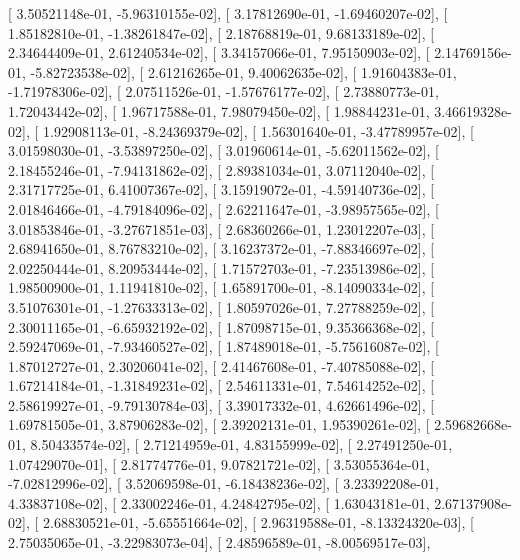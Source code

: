 \documentclass{article}
\begin{document}
       [  3.50521148e-01,  -5.96310155e-02],
       [  3.17812690e-01,  -1.69460207e-02],
       [  1.85182810e-01,  -1.38261847e-02],
       [  2.18768819e-01,   9.68133189e-02],
       [  2.34644409e-01,   2.61240534e-02],
       [  3.34157066e-01,   7.95150903e-02],
       [  2.14769156e-01,  -5.82723538e-02],
       [  2.61216265e-01,   9.40062635e-02],
       [  1.91604383e-01,  -1.71978306e-02],
       [  2.07511526e-01,  -1.57676177e-02],
       [  2.73880773e-01,   1.72043442e-02],
       [  1.96717588e-01,   7.98079450e-02],
       [  1.98844231e-01,   3.46619328e-02],
       [  1.92908113e-01,  -8.24369379e-02],
       [  1.56301640e-01,  -3.47789957e-02],
       [  3.01598030e-01,  -3.53897250e-02],
       [  3.01960614e-01,  -5.62011562e-02],
       [  2.18455246e-01,  -7.94131862e-02],
       [  2.89381034e-01,   3.07112040e-02],
       [  2.31717725e-01,   6.41007367e-02],
       [  3.15919072e-01,  -4.59140736e-02],
       [  2.01846466e-01,  -4.79184096e-02],
       [  2.62211647e-01,  -3.98957565e-02],
       [  3.01853846e-01,  -3.27671851e-03],
       [  2.68360266e-01,   1.23012207e-03],
       [  2.68941650e-01,   8.76783210e-02],
       [  3.16237372e-01,  -7.88346697e-02],
       [  2.02250444e-01,   8.20953444e-02],
       [  1.71572703e-01,  -7.23513986e-02],
       [  1.98500900e-01,   1.11941810e-02],
       [  1.65891700e-01,  -8.14090334e-02],
       [  3.51076301e-01,  -1.27633313e-02],
       [  1.80597026e-01,   7.27788259e-02],
       [  2.30011165e-01,  -6.65932192e-02],
       [  1.87098715e-01,   9.35366368e-02],
       [  2.59247069e-01,  -7.93460527e-02],
       [  1.87489018e-01,  -5.75616087e-02],
       [  1.87012727e-01,   2.30206041e-02],
       [  2.41467608e-01,  -7.40785088e-02],
       [  1.67214184e-01,  -1.31849231e-02],
       [  2.54611331e-01,   7.54614252e-02],
       [  2.58619927e-01,  -9.79130784e-03],
       [  3.39017332e-01,   4.62661496e-02],
       [  1.69781505e-01,   3.87906283e-02],
       [  2.39202131e-01,   1.95390261e-02],
       [  2.59682668e-01,   8.50433574e-02],
       [  2.71214959e-01,   4.83155999e-02],
       [  2.27491250e-01,   1.07429070e-01],
       [  2.81774776e-01,   9.07821721e-02],
       [  3.53055364e-01,  -7.02812996e-02],
       [  3.52069598e-01,  -6.18438236e-02],
       [  3.23392208e-01,   4.33837108e-02],
       [  2.33002246e-01,   4.24842795e-02],
       [  1.63043181e-01,   2.67137908e-02],
       [  2.68830521e-01,  -5.65551664e-02],
       [  2.96319588e-01,  -8.13324320e-03],
       [  2.75035065e-01,  -3.22983073e-04],
       [  2.48596589e-01,  -8.00569517e-03],
\end{document}
